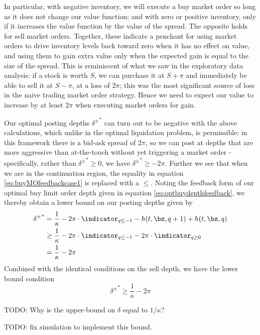 \documentclass[12pt]{article}
\begin{document}
In particular, with negative inventory, we will execute a buy market order so long as it does not change our value function; and with zero or positive inventory, only if it increases the value function by the value of the spread. The opposite holds for sell market orders. Together, these indicate a penchant for using market orders to drive inventory levels back toward zero when it has no effect on value, and using them to gain extra value only when the expected gain is equal to the size of the spread. This is reminiscent of what we saw in the exploratory data analysis: if a stock is worth $S$, we can purchase it at $S+\pi$ and immediately be able to sell it at $S-\pi$, at a loss of $2 \pi$; this was the most significant source of loss in the naive trading market order strategy. Hence we need to expect our value to increase by at least $2\pi$ when executing market orders for gain.

Our optimal posting depths ${\delta^\pm}^*$ can turn out to be negative with the above calculations, which unlike in the optimal liquidation problem, is permissible: in this framework there is a bid-ask spread of $2\pi$, so we can post at depths that are more aggressive than at-the-touch without yet triggering a market order - specifically, rather than ${\delta^\pm}^* \geq 0$, we have ${\delta^\pm}^* \geq -2\pi$. Further we see that when we are in the continuation region, the equality in equation \ref{eq:buyMOfeedbackcase1} is replaced with a $\leq$. Noting the feedback form of our optimal buy limit order depth given in equation \ref{eq:optbuydepthfeedback}, we thereby obtain a lower bound on our posting depths given by
\begin{align*}
{\delta^+}^* & = \frac{1}{\kappa} - 2 \pi \cdot \indicator_{q \leq -1} - h(t,\bz,q+1) + h(t,\bz,q) \\
& \geq \frac{1}{\kappa} - 2 \pi \cdot \indicator_{q \leq -1} - 2 \pi \cdot \indicator_{q \geq 0} \\
& = \frac{1}{\kappa} - 2\pi
\end{align*}
Combined with the identical conditions on the sell depth, we have the lower bound condition
\begin{equation}
\label{eq:deltaslowerboundcase1}
\boxed{ {\delta^\pm}^* \geq \frac{1}{\kappa} - 2\pi }
\end{equation}

TODO: Why is the upper-bound on $\delta$ equal to $1/\kappa$?

TODO: fix simulation to implement this bound. 
\end{document}
